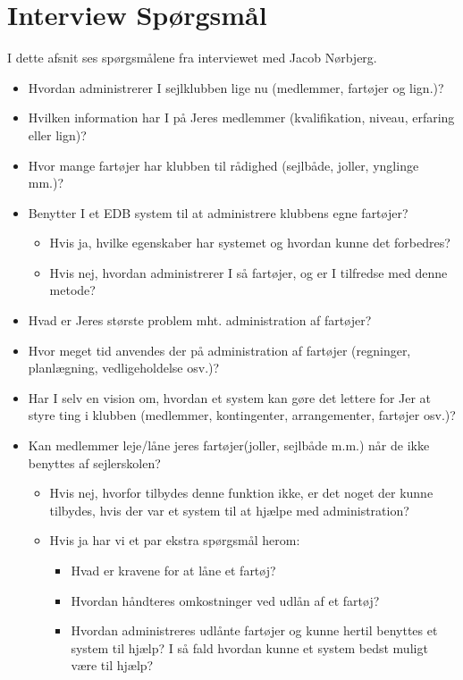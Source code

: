 \chapter{Interview Spørgsmål} \label{questions}
I dette afsnit ses spørgsmålene fra interviewet med Jacob Nørbjerg.

\begin{itemize}
\item Hvordan administrerer I sejlklubben lige nu (medlemmer, fartøjer og lign.)?
\item Hvilken information har I på Jeres medlemmer (kvalifikation, niveau, erfaring eller lign)?
\item Hvor mange fartøjer har klubben til rådighed (sejlbåde, joller, ynglinge mm.)?
\item Benytter I et EDB system til at administrere klubbens egne fartøjer?
	\begin{itemize}
	\item Hvis ja, hvilke egenskaber har systemet og hvordan kunne det forbedres?
	\item Hvis nej, hvordan administrerer I så fartøjer, og er I tilfredse med denne metode?
	\end{itemize}
\item Hvad er Jeres største problem mht. administration af fartøjer?
\item Hvor meget tid anvendes der på administration af fartøjer (regninger, planlægning, vedligeholdelse osv.)?
\item Har I selv en vision om, hvordan et system kan gøre det lettere for Jer at styre ting i klubben (medlemmer, kontingenter, arrangementer, fartøjer osv.)?
\item Kan medlemmer leje/låne jeres fartøjer(joller, sejlbåde m.m.) når de ikke benyttes af sejlerskolen?
	\begin{itemize}
	\item Hvis nej, hvorfor tilbydes denne funktion ikke, er det noget der kunne tilbydes, hvis der var et system til at hjælpe med administration?
	\item Hvis ja har vi et par ekstra spørgsmål herom:
		\begin{itemize}
		\item Hvad er kravene for at låne et fartøj?
		\item Hvordan håndteres omkostninger ved udlån af et fartøj?
		\item Hvordan administreres udlånte fartøjer og kunne hertil benyttes et system til hjælp? I så fald hvordan kunne et system bedst muligt være til hjælp?
		\end{itemize}
	\end{itemize}
\end{itemize}
